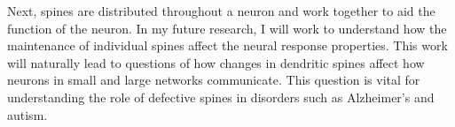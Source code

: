 \documentclass[a4paper,11pt]{article}
\begin{document}
Next, spines are distributed throughout a neuron and work together to aid the function of the neuron. In my future research, I will work to understand how the maintenance of individual spines affect the neural response properties. This work will naturally lead to questions of how changes in dendritic spines affect how neurons in small and large networks communicate. This question is vital for understanding the role of defective spines in disorders such as Alzheimer's and autism.




\end{document}
